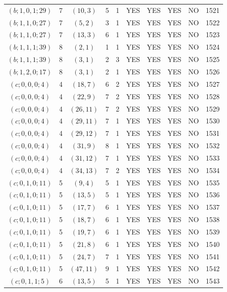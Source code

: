 \begin{longtable}{|c|c|c|c|c|c|c|c|c|c|}
$(b; 1, 0, 1; 29)$ & 7 & $(10, 3)$ & 5 & 1 & YES & YES & YES & NO & 1521\\
$(b; 1, 1, 0; 27)$ & 7 & $(5, 2)$ & 3 & 1 & YES & YES & YES & NO & 1522\\
$(b; 1, 1, 0; 27)$ & 7 & $(13, 3)$ & 6 & 1 & YES & YES & YES & NO & 1523\\
$(b; 1, 1, 1; 39)$ & 8 & $(2, 1)$ & 1 & 1 & YES & YES & YES & NO & 1524\\
$(b; 1, 1, 1; 39)$ & 8 & $(3, 1)$ & 2 & 3 & YES & YES & YES & NO & 1525\\
$(b; 1, 2, 0; 17)$ & 8 & $(3, 1)$ & 2 & 1 & YES & YES & YES & NO & 1526\\
$(c; 0, 0, 0; 4)$ & 4 & $(18, 7)$ & 6 & 2 & YES & YES & YES & NO & 1527\\
$(c; 0, 0, 0; 4)$ & 4 & $(22, 9)$ & 7 & 2 & YES & YES & YES & NO & 1528\\
$(c; 0, 0, 0; 4)$ & 4 & $(26, 11)$ & 7 & 2 & YES & YES & YES & NO & 1529\\
$(c; 0, 0, 0; 4)$ & 4 & $(29, 11)$ & 7 & 1 & YES & YES & YES & NO & 1530\\
$(c; 0, 0, 0; 4)$ & 4 & $(29, 12)$ & 7 & 1 & YES & YES & YES & NO & 1531\\
$(c; 0, 0, 0; 4)$ & 4 & $(31, 9)$ & 8 & 1 & YES & YES & YES & NO & 1532\\
$(c; 0, 0, 0; 4)$ & 4 & $(31, 12)$ & 7 & 1 & YES & YES & YES & NO & 1533\\
$(c; 0, 0, 0; 4)$ & 4 & $(34, 13)$ & 7 & 2 & YES & YES & YES & NO & 1534\\
$(c; 0, 1, 0; 11)$ & 5 & $(9, 4)$ & 5 & 1 & YES & YES & YES & NO & 1535\\
$(c; 0, 1, 0; 11)$ & 5 & $(13, 5)$ & 5 & 1 & YES & YES & YES & NO & 1536\\
$(c; 0, 1, 0; 11)$ & 5 & $(17, 7)$ & 6 & 1 & YES & YES & YES & NO & 1537\\
$(c; 0, 1, 0; 11)$ & 5 & $(18, 7)$ & 6 & 1 & YES & YES & YES & NO & 1538\\
$(c; 0, 1, 0; 11)$ & 5 & $(19, 7)$ & 6 & 1 & YES & YES & YES & NO & 1539\\
$(c; 0, 1, 0; 11)$ & 5 & $(21, 8)$ & 6 & 1 & YES & YES & YES & NO & 1540\\
$(c; 0, 1, 0; 11)$ & 5 & $(24, 7)$ & 7 & 1 & YES & YES & YES & NO & 1541\\
$(c; 0, 1, 0; 11)$ & 5 & $(47, 11)$ & 9 & 1 & YES & YES & YES & NO & 1542\\
$(c; 0, 1, 1; 5)$ & 6 & $(13, 5)$ & 5 & 1 & YES & YES & YES & NO & 1543\\

\end{longtable}
